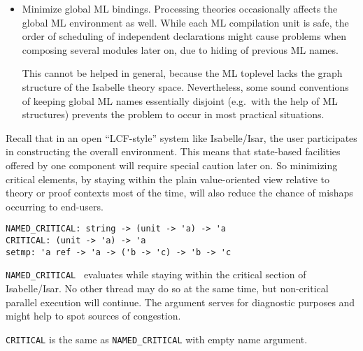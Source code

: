\begin{isabellebody}
\begin{isamarkuptext}
\begin{itemize}
  \item Minimize global ML bindings.  Processing theories occasionally
  affects the global ML environment as well.  While each ML
  compilation unit is safe, the order of scheduling of independent
  declarations might cause problems when composing several modules
  later on, due to hiding of previous ML names.

  This cannot be helped in general, because the ML toplevel lacks the
  graph structure of the Isabelle theory space.  Nevertheless, some
  sound conventions of keeping global ML names essentially disjoint
  (e.g.\ with the help of ML structures) prevents the problem to occur
  in most practical situations.

  \end{itemize}

  Recall that in an open ``LCF-style'' system like Isabelle/Isar, the
  user participates in constructing the overall environment.  This
  means that state-based facilities offered by one component will
  require special caution later on.  So minimizing critical elements,
  by staying within the plain value-oriented view relative to theory
  or proof contexts most of the time, will also reduce the chance of
  mishaps occurring to end-users.%
\end{isamarkuptext}%
\isamarkuptrue%
%
\isadelimmlref
%
\endisadelimmlref
%
\isatagmlref
%
\begin{isamarkuptext}%
\begin{mldecls}
  \verb|NAMED_CRITICAL: string -> (unit -> 'a) -> 'a| \\
  \verb|CRITICAL: (unit -> 'a) -> 'a| \\
  \verb|setmp: 'a ref -> 'a -> ('b -> 'c) -> 'b -> 'c| \\
  \end{mldecls}

  \begin{description}

  \item \verb|NAMED_CRITICAL|~ evaluates 
  while staying within the critical section of Isabelle/Isar.  No
  other thread may do so at the same time, but non-critical parallel
  execution will continue.  The  argument serves for
  diagnostic purposes and might help to spot sources of congestion.

  \item \verb|CRITICAL| is the same as \verb|NAMED_CRITICAL| with empty
  name argument.


\end{description}
\end{isamarkuptext}
\end{isabellebody}
